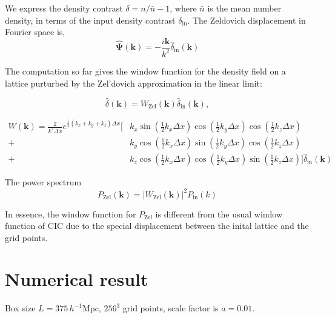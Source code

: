 \documentclass[a4paper,11pt]{article}
\begin{document}
We express the density contrast $\delta = n/\bar{n} - 1$, where
$\bar{n}$ is the mean number density, in terms of the input density
contrast $\delta_\mathrm{in}$. The Zeldovich displacement in Fourier
space is,
\begin{equation}
  \hat{\bm{\Psi}}(\bm{k}) = -\frac{i\bm{k}}{k^2} \hat{\delta}_\mathrm{in}(\bm{k})
\end{equation}

The computation so far gives the window function for the density field
on a lattice purturbed by the Zel'dovich approximation in the linear
limit:

\begin{equation}
  \hat{\delta}(\bm{k}) = W_\mathrm{Zel}(\bm{k}) \hat{\delta}_\mathrm{in}(\bm{k}),
\end{equation}

\begin{equation}
\begin{split}
  W(\bm{k}) = \frac{2}{k^2 \Delta x}
              e^{\frac{i}{2}  (k_x + k_y + k_z) \Delta x} \bigg[
      &k_x \sin\left( \frac{1}{2} k_x \Delta x \right)
        \cos\left( \frac{1}{2} k_y \Delta x \right)
        \cos\left( \frac{1}{2} k_z \Delta x \right)\\
    + &k_y \cos\left( \frac{1}{2} k_x \Delta x \right)
        \sin\left( \frac{1}{2} k_y \Delta x \right)
        \cos\left( \frac{1}{2} k_z \Delta x \right)\\
    + &k_z \cos\left( \frac{1}{2} k_x \Delta x \right)
        \cos\left( \frac{1}{2} k_y \Delta x \right)
        \sin\left( \frac{1}{2} k_z \Delta x \right) \bigg]
    \hat{\delta}_\mathrm{in}(\bm{k})
\end{split}
\end{equation}

The power spectrum
\begin{equation}
  \label{eq:power-spectrum}
  P_\mathrm{Zel}(\bm{k}) = |W_\mathrm{Zel}(\bm{k})|^2 P_\mathrm{in}(k)
\end{equation}

In essence, the window function for $P_\mathrm{Zel}$ is different from
the usual window function of CIC due to the special displacement
between the inital lattice and the grid points.


\section{Numerical result}

Box size $L = 375 \, h^{-1} \mathrm{Mpc}$, $256^3$ grid points, scale factor is $a=0.01$.

\label{LastPage}
\end{document}
